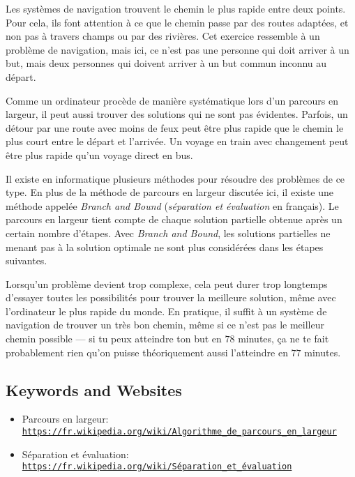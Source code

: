 \documentclass[a4paper,11pt]{report}
\newcommand{\BrochureUrlText}[1]{\texttt{#1}}
\begin{document}
Les systèmes de navigation trouvent le chemin le plus rapide entre deux points. Pour cela, ils font attention à ce que le chemin passe par des routes adaptées, et non pas à travers champs ou par des rivières. Cet exercice ressemble à un problème de navigation, mais ici, ce n’est pas une personne qui doit arriver à un but, mais deux personnes qui doivent arriver à un but commun inconnu au départ.

Comme un ordinateur procède de manière systématique lors d’un parcours en largeur, il peut aussi trouver des solutions qui ne sont pas évidentes. Parfois, un détour par une route avec moins de feux peut être plus rapide que le chemin le plus court entre le départ et l’arrivée. Un voyage en train avec changement peut être plus rapide qu’un voyage direct en bus.

Il existe en informatique plusieurs méthodes pour résoudre des problèmes de ce type. En plus de la méthode de parcours en largeur discutée ici, il existe une méthode appelée \emph{Branch and Bound} (\emph{séparation et évaluation} en français). Le parcours en largeur tient compte de chaque solution partielle obtenue après un certain nombre d’étapes. Avec \emph{Branch and Bound}, les solutions partielles ne menant pas à la solution optimale ne sont plus considérées dans les étapes suivantes.

Lorsqu’un problème devient trop complexe, cela peut durer trop longtemps d’essayer toutes les possibilités pour trouver la meilleure solution, même avec l’ordinateur le plus rapide du monde. En pratique,  il suffit à un système de navigation de trouver un très bon chemin, même si ce n’est pas le meilleur chemin possible — si tu peux atteindre ton but en $78$ minutes, ça ne te fait probablement rien qu’on puisse théoriquement aussi l’atteindre en $77$ minutes.

{\raggedright

\subsection*{Keywords and Websites}

\begin{itemize}
  \item Parcours en largeur: \href{https://fr.wikipedia.org/wiki/Algorithme_de_parcours_en_largeur}{\BrochureUrlText{https://fr.wikipedia.org/wiki/Algorithme\_de\_parcours\_en\_largeur}}
  \item Séparation et évaluation: \href{https://fr.wikipedia.org/wiki/S\%C3\%A9paration_et_\%C3\%A9valuation}{\BrochureUrlText{https://fr.wikipedia.org/wiki/Séparation\_et\_évaluation}}
\end{itemize}


}
\end{document}
